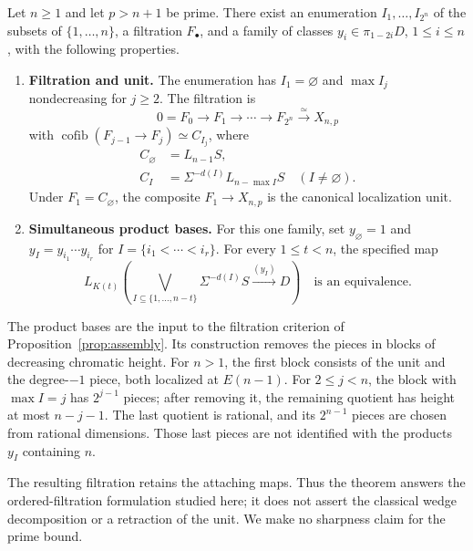 \begin{theorem}\label{thm:main}
Let \(n\geq1\) and let \(p>n+1\) be prime. There exist an
enumeration \(I_1,\ldots,I_{2^n}\) of the subsets of
\(\{1,\ldots,n\}\), a filtration \(F_\bullet\), and a family of
classes \(y_i\in\pi_{1-2i}D\), \(1\leq i\leq n\), with the
following properties.
\begin{enumerate}[label=(\alph*)]
\item \textbf{Filtration and unit.}
The enumeration has \(I_1=\varnothing\) and \(\max I_j\)
nondecreasing for \(j\geq2\). The filtration is
\[
 0=F_0\longrightarrow F_1\longrightarrow\cdots
 \longrightarrow F_{2^n}\xrightarrow{\simeq}X_{n,p}
\]
with \(\operatorname{cofib}(F_{j-1}\to F_j)\simeq C_{I_j}\), where
\begin{equation}\label{eq:pieces}
 \begin{aligned}
 C_\varnothing&=L_{n-1}S,\\
 C_I&=\Sigma^{-d(I)}L_{n-\max I}S
       \quad(I\ne\varnothing).
 \end{aligned}
\end{equation}
Under \(F_1=C_\varnothing\), the composite \(F_1\to X_{n,p}\) is the
canonical localization unit.
\item \textbf{Simultaneous product bases.}
For this one family, set \(y_\varnothing=1\) and
\(y_I=y_{i_1}\cdots y_{i_r}\) for \(I=\{i_1<\cdots<i_r\}\).
For every \(1\leq t<n\), the specified map
\begin{equation}\label{eq:height-basis}
 L_{K(t)}
 \left(\bigvee_{I\subseteq\{1,\ldots,n-t\}}
       \Sigma^{-d(I)}S\xrightarrow{(y_I)}D\right)
 \quad\text{is an equivalence}.
\end{equation}
\end{enumerate}
\end{theorem}

The product bases are the input to the filtration criterion of
Proposition~\ref{prop:assembly}. Its construction removes the pieces
in blocks of decreasing chromatic height. For \(n>1\), the first block
consists of the unit and the degree-\(-1\) piece, both localized at
\(E(n-1)\). For \(2\leq j<n\), the block with \(\max I=j\)
has \(2^{j-1}\) pieces; after removing it, the remaining quotient
has height at most \(n-j-1\). The last quotient is rational, and its
\(2^{n-1}\) pieces are chosen from rational dimensions. Those last
pieces are not identified with the products \(y_I\) containing \(n\).

The resulting filtration retains the attaching maps. Thus the theorem
answers the ordered-filtration formulation studied here; it does not
assert the classical wedge decomposition or a retraction of the unit.
We make no sharpness claim for the prime bound.

